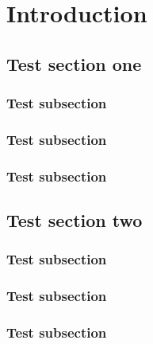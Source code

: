 \chapter{Introduction}


\section{Test section one}
\subsection{Test subsection}
\subsection{Test subsection}
\subsection{Test subsection}

\section{Test section two}
\subsection{Test subsection}
\subsection{Test subsection}
\subsection{Test subsection}
